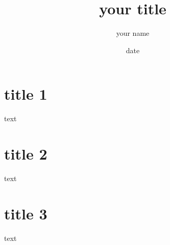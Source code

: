 \documentclass[12pt]{article}
\title{your title}
\author{your name}
\date{date}
\begin{document}
\maketitle

\newpage

\section{title 1}
text

\section{title 2}
text

\section{title 3}
text
\end{document}
